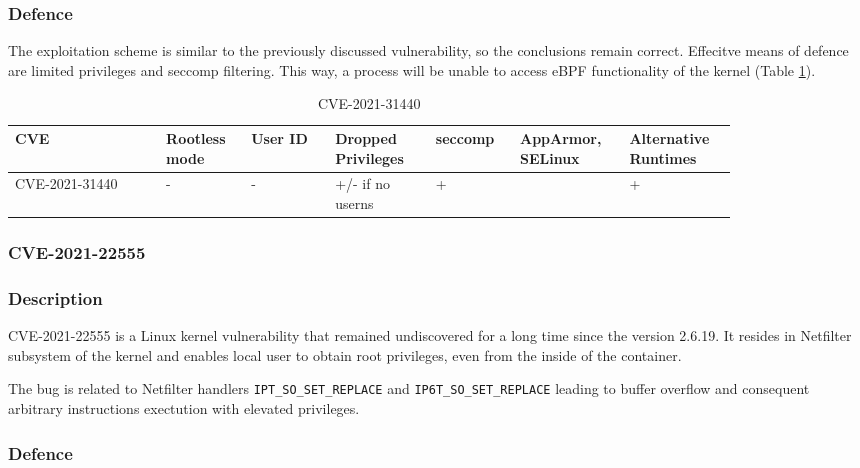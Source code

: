 \subsubsection*{Defence}

The exploitation scheme is similar to the previously discussed vulnerability, so the conclusions remain correct. Effecitve means of defence are limited privileges and seccomp filtering. This way, a process will be unable to access eBPF functionality of the kernel (Table \ref{tab:h:5}).

\begin{table}[H]
    \centering \small
    \begin{tabular}{| p{0.18\linewidth} | p{0.1\linewidth} | p{0.1\linewidth} | p{0.12\linewidth} | p{0.1\linewidth} | p{0.12\linewidth} | p{0.12\linewidth} |} \hline
    CVE & Rootless mode & User ID & Dropped Privileges & seccomp & AppArmor, SELinux & Alternative Runtimes \\ \hline
    CVE-2021-31440 & - & - & \cellcolor{yellow!25} +/- \linebreak if no userns & \cellcolor{green!25} + &  & \cellcolor{green!25} + \\ \hline
    \end{tabular}
    \caption{CVE-2021-31440}
    \label{tab:h:5}
\end{table}




\subsubsection{CVE-2021-22555}
\subsubsection*{Description}

CVE-2021-22555 is a Linux kernel vulnerability that remained undiscovered for a long time since the version 2.6.19. It resides in Netfilter subsystem of the kernel and enables local user to obtain root privileges, even from the inside of the container.

The bug is related to Netfilter handlers \texttt{IPT\_SO\_SET\_REPLACE} and \texttt{IP6T\_SO\_SET\_REPLACE} leading to buffer overflow and consequent arbitrary instructions exectution with elevated privileges.

\subsubsection*{Defence}

